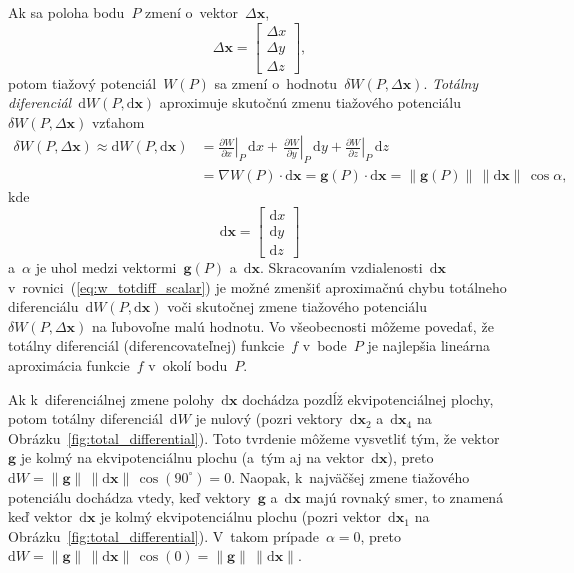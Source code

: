 \documentclass[a4paper, 12pt]{book}
\newcommand{\diff}{\mathrm d}
\let\vec\mathbf
\begin{document}
Ak sa poloha bodu~$P$ zmení o~vektor~$\Delta \vec x$,
%
\begin{equation}
\label{eq:deltax}
\Delta \vec x =
\begin{bmatrix}
\Delta x\\
\Delta y\\
\Delta z
\end{bmatrix}
{,}
\end{equation}
%
potom tiažový potenciál~$W(P)$ sa zmení o~hodnotu~$\delta W(P, \Delta \vec x)$.  
\emph{Totálny diferenciál}~$\diff W(P, \diff \vec x)$ aproximuje skutočnú zmenu 
tiažového potenciálu~$\delta W(P, \Delta \vec x)$ vzťahom
%
\begin{equation}
\label{eq:w_totdiff_scalar}
\begin{split}
\delta W(P, \Delta \vec x) \approx \diff W(P, \diff \vec x) &= 
\left.\frac{\partial W}{\partial x}\right|_P \, \diff x + \, 
\left.\frac{\partial W}{\partial y}\right|_P \, \diff y + \left.\frac{\partial 
W}{\partial z}\right|_P \, \diff z\\
%
&= \nabla W(P) \cdot \diff \vec x = \vec g(P) \cdot \diff \vec x = \| \vec g(P) 
\| \, \| \diff \vec x \| \, \cos\alpha{,}
\end{split}
\end{equation}
%
kde
%
\begin{equation}
\label{eq:diffx}
\diff \vec x =
\begin{bmatrix}
\diff x\\
\diff y\\
\diff z
\end{bmatrix}
\end{equation}
%
a~$\alpha$ je uhol medzi vektormi~$\vec g(P)$ a~$\diff \vec x$.  Skracovaním 
vzdialenosti~$\diff \vec x$ v~rovnici~(\ref{eq:w_totdiff_scalar}) je možné 
zmenšiť aproximačnú chybu totálneho diferenciálu~$\diff W(P, \diff \vec x)$ 
voči skutočnej zmene tiažového potenciálu~$\delta W(P, \Delta \vec x)$ na 
ľubovoľne malú hodnotu.  Vo všeobecnosti môžeme povedať, že totálny diferenciál 
(diferencovateľnej) funkcie~$f$ v~bode~$P$ je najlepšia lineárna aproximácia 
funkcie~$f$ v~okolí bodu~$P$.

Ak k~diferenciálnej zmene polohy~$\diff \vec x$ dochádza pozdĺž 
ekvipotenciálnej plochy, potom totálny diferenciál~$\diff W$ je nulový (pozri 
vektory~$\diff \vec x_2$ a~$\diff \vec x_4$ na 
Obrázku~\ref{fig:total_differential}).  Toto tvrdenie môžeme vysvetliť tým, že 
vektor~$\vec g$ je kolmý na ekvipotenciálnu plochu (a~tým aj na vektor~$\diff 
\vec x$), preto $\diff W = \| \vec g \| \, \| \diff \vec x \| \, 
\cos(90^{\circ}) = 0$.  Naopak, k~najväčšej zmene tiažového potenciálu dochádza 
vtedy, keď vektory~$\vec g$ a~$\diff \vec x$ majú rovnaký smer, to znamená keď 
vektor~$\diff \vec x$ je kolmý ekvipotenciálnu plochu (pozri vektor~$\diff \vec 
x_1$ na Obrázku~\ref{fig:total_differential}).  V~takom prípade~$\alpha = 0$, 
preto $\diff W = \| \vec g \| \, \| \diff \vec x \| \, \cos(0) = \| \vec g \| 
\, \| \diff \vec x \|$.
\end{document}
